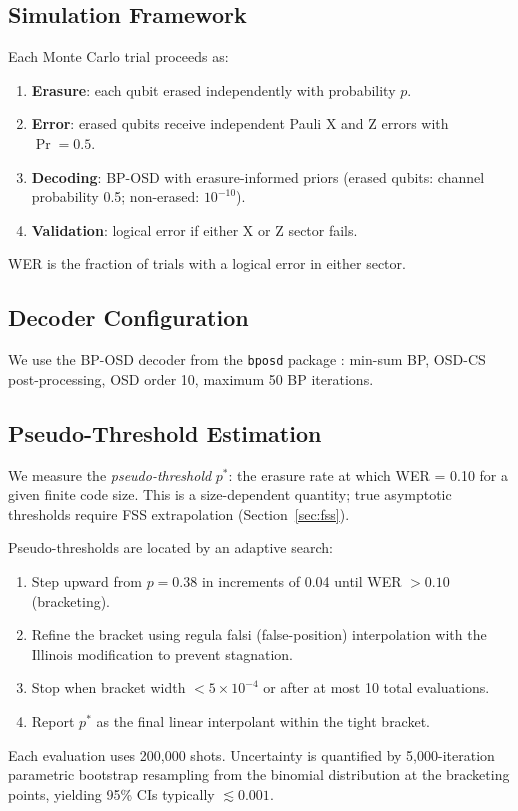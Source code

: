 \documentclass[twocolumn,10pt]{article}
\begin{document}
\subsection{Simulation Framework}

Each Monte Carlo trial proceeds as:
\begin{enumerate}
    \item \textbf{Erasure}: each qubit erased independently with probability $p$.
    \item \textbf{Error}: erased qubits receive independent Pauli X and Z errors with $\Pr=0.5$.
    \item \textbf{Decoding}: BP-OSD with erasure-informed priors (erased qubits: channel
          probability 0.5; non-erased: $10^{-10}$).
    \item \textbf{Validation}: logical error if either X or Z sector fails.
\end{enumerate}
WER is the fraction of trials with a logical error in either sector.

\subsection{Decoder Configuration}

We use the BP-OSD decoder from the \texttt{bposd} package \cite{roffe2020decoding}:
min-sum BP, OSD-CS post-processing, OSD order 10, maximum 50 BP iterations.

\subsection{Pseudo-Threshold Estimation}

We measure the \emph{pseudo-threshold} $p^*$: the erasure rate at which WER = 0.10 for a given
finite code size.
This is a size-dependent quantity; true asymptotic thresholds require FSS extrapolation
(Section~\ref{sec:fss}).

Pseudo-thresholds are located by an adaptive search:
\begin{enumerate}
    \item Step upward from $p=0.38$ in increments of 0.04 until WER $> 0.10$ (bracketing).
    \item Refine the bracket using regula falsi (false-position) interpolation with the Illinois
          modification to prevent stagnation.
    \item Stop when bracket width $< 5\times10^{-4}$ or after at most 10 total evaluations.
    \item Report $p^*$ as the final linear interpolant within the tight bracket.
\end{enumerate}
Each evaluation uses 200{,}000 shots.
Uncertainty is quantified by 5{,}000-iteration parametric bootstrap resampling from the
binomial distribution at the bracketing points, yielding 95\% CIs typically $\lesssim 0.001$.
\end{document}
